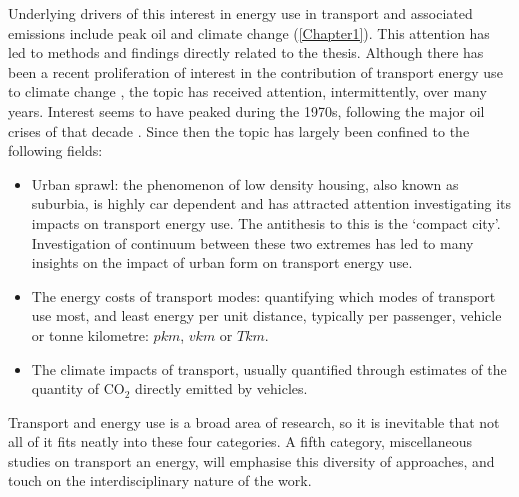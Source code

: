 Underlying drivers of this interest in energy use in transport and
associated emissions include peak oil and climate
change (\cref{Chapter1}). This attention has led to 
methods and findings directly related to the thesis.
Although there has been a recent proliferation of interest in the contribution of
transport energy use to climate change \citep{Schwanen2011}, the topic
has  received attention, intermittently, over many years. Interest seems to
have peaked during the 1970s,
following the major oil crises of that decade \citep{Greer2009}. Since then the
topic has largely been confined to the following fields:
\begin{itemize}
 \item Urban sprawl:
 the phenomenon of low density housing, also known as suburbia, is highly car
dependent and has attracted attention investigating its impacts on transport energy
use. The antithesis to this is the `compact city'. Investigation of continuum between
these two extremes has led to many insights on the impact of urban form on transport energy use.
\item The energy costs of transport modes: quantifying which modes of transport
use most, and least energy per unit distance, typically per passenger, vehicle or
tonne kilometre: $pkm$, $vkm$ or $Tkm$.
\item The climate impacts of transport, usually quantified through estimates
of the quantity of CO$_2$ directly emitted by vehicles.
\end{itemize}
Transport and energy use is a broad area of research, so it
is inevitable that not all of it fits neatly into these four categories. A fifth
category, miscellaneous studies on transport an energy, will emphasise this
diversity of approaches, and touch on the interdisciplinary nature of the work.

